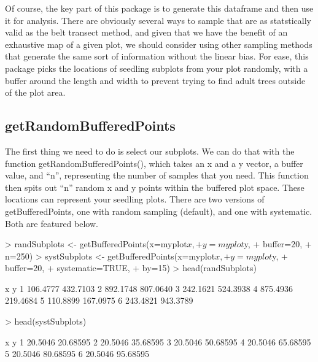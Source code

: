 \documentclass{article}
\begin{document}
Of course, the key part of this package is to generate this dataframe and then use it for analysis. There are obviously several ways to sample that are as statstically valid as the belt transect method, and given that we have the benefit of an exhaustive map of a given plot, we should consider using other sampling methods that generate the same sort of information without the linear bias. For ease, this package picks the locations of seedling subplots from your plot randomly, with a buffer around the length and width to prevent trying to find adult trees outside of the plot area.

\subsection{getRandomBufferedPoints}

The first thing we need to do is select our subplots. We can do that with the function getRandomBufferedPoints(), which takes an x and a y vector, a buffer value, and ``n'', representing the number of samples that you need. This function then spits out ``n'' random x and y points within the buffered plot space. These locations can represent your seedling plots. There are two versions of getBufferedPoints, one with random sampling (default), and one with systematic. Both are featured below.

\begin{Schunk}
\begin{Sinput}
> randSubplots <- getBufferedPoints(x=myplot$x,
+                                   y=myplot$y,
+                                   buffer=20,
+                                   n=250)
> systSubplots <- getBufferedPoints(x=myplot$x,
+                                     y=myplot$y,
+                                     buffer=20,
+                                     systematic=TRUE,
+                                     by=15)
> head(randSubplots)
\end{Sinput}
\begin{Soutput}
         x        y
1 106.4777 432.7103
2 892.1748 807.0640
3 242.1621 524.3938
4 875.4936 219.4684
5 110.8899 167.0975
6 243.4821 943.3789
\end{Soutput}
\begin{Sinput}
> head(systSubplots)
\end{Sinput}
\begin{Soutput}
        x        y
1 20.5046 20.68595
2 20.5046 35.68595
3 20.5046 50.68595
4 20.5046 65.68595
5 20.5046 80.68595
6 20.5046 95.68595
\end{Soutput}
\end{Schunk}
\end{document}
